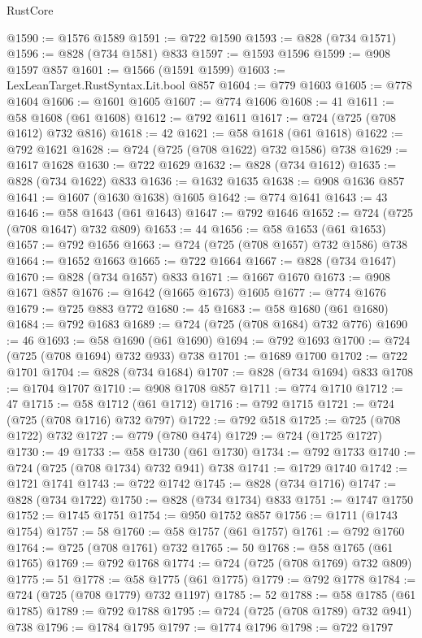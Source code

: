 \begin{lexlean}{RustCore}
\begin{coremodule}
@1590 := @1576 @1589
@1591 := @722 @1590
@1593 := @828 (@734 @1571)
@1596 := @828 (@734 @1581) @833
@1597 := @1593 @1596
@1599 := @908 @1597 @857
@1601 := @1566 (@1591 @1599)
@1603 := LexLeanTarget.RustSyntax.Lit.bool @857
@1604 := @779 @1603
@1605 := @778 @1604
@1606 := @1601 @1605
@1607 := @774 @1606
@1608 := 41
@1611 := @58 @1608 (@61 @1608)
@1612 := @792 @1611
@1617 := @724 (@725 (@708 @1612) @732 @816)
@1618 := 42
@1621 := @58 @1618 (@61 @1618)
@1622 := @792 @1621
@1628 := @724 (@725 (@708 @1622) @732 @1586) @738
@1629 := @1617 @1628
@1630 := @722 @1629
@1632 := @828 (@734 @1612)
@1635 := @828 (@734 @1622) @833
@1636 := @1632 @1635
@1638 := @908 @1636 @857
@1641 := @1607 (@1630 @1638) @1605
@1642 := @774 @1641
@1643 := 43
@1646 := @58 @1643 (@61 @1643)
@1647 := @792 @1646
@1652 := @724 (@725 (@708 @1647) @732 @809)
@1653 := 44
@1656 := @58 @1653 (@61 @1653)
@1657 := @792 @1656
@1663 := @724 (@725 (@708 @1657) @732 @1586) @738
@1664 := @1652 @1663
@1665 := @722 @1664
@1667 := @828 (@734 @1647)
@1670 := @828 (@734 @1657) @833
@1671 := @1667 @1670
@1673 := @908 @1671 @857
@1676 := @1642 (@1665 @1673) @1605
@1677 := @774 @1676
@1679 := @725 @883 @772
@1680 := 45
@1683 := @58 @1680 (@61 @1680)
@1684 := @792 @1683
@1689 := @724 (@725 (@708 @1684) @732 @776)
@1690 := 46
@1693 := @58 @1690 (@61 @1690)
@1694 := @792 @1693
@1700 := @724 (@725 (@708 @1694) @732 @933) @738
@1701 := @1689 @1700
@1702 := @722 @1701
@1704 := @828 (@734 @1684)
@1707 := @828 (@734 @1694) @833
@1708 := @1704 @1707
@1710 := @908 @1708 @857
@1711 := @774 @1710
@1712 := 47
@1715 := @58 @1712 (@61 @1712)
@1716 := @792 @1715
@1721 := @724 (@725 (@708 @1716) @732 @797)
@1722 := @792 @518
@1725 := @725 (@708 @1722) @732
@1727 := @779 (@780 @474)
@1729 := @724 (@1725 @1727)
@1730 := 49
@1733 := @58 @1730 (@61 @1730)
@1734 := @792 @1733
@1740 := @724 (@725 (@708 @1734) @732 @941) @738
@1741 := @1729 @1740
@1742 := @1721 @1741
@1743 := @722 @1742
@1745 := @828 (@734 @1716)
@1747 := @828 (@734 @1722)
@1750 := @828 (@734 @1734) @833
@1751 := @1747 @1750
@1752 := @1745 @1751
@1754 := @950 @1752 @857
@1756 := @1711 (@1743 @1754)
@1757 := 58
@1760 := @58 @1757 (@61 @1757)
@1761 := @792 @1760
@1764 := @725 (@708 @1761) @732
@1765 := 50
@1768 := @58 @1765 (@61 @1765)
@1769 := @792 @1768
@1774 := @724 (@725 (@708 @1769) @732 @809)
@1775 := 51
@1778 := @58 @1775 (@61 @1775)
@1779 := @792 @1778
@1784 := @724 (@725 (@708 @1779) @732 @1197)
@1785 := 52
@1788 := @58 @1785 (@61 @1785)
@1789 := @792 @1788
@1795 := @724 (@725 (@708 @1789) @732 @941) @738
@1796 := @1784 @1795
@1797 := @1774 @1796
@1798 := @722 @1797

\end{coremodule}
\end{lexlean}
